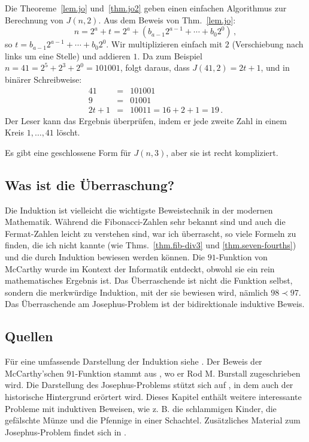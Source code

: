 Die Theoreme~\ref{lem.jo} und~\ref{thm.jo2} geben einen einfachen Algorithmus zur Berechnung von $J(n,2)$. Aus dem Beweis von Thm.~\ref{lem.jo}:
\[
n=2^a+t=2^a+(b_{a-1}2^{a-1}+\cdots+b_{0}2^{0})\,,
\]
so $t=b_{a-1}2^{a-1}+\cdots+b_{0}2^{0}$. Wir multiplizieren einfach mit $2$ (Verschiebung nach links um eine Stelle) und addieren $1$. Da zum Beispiel $n=41=2^5+2^3+2^0=101001$, folgt daraus, dass $J(41,2)=2t+1$, und in binärer Schreibweise:
\begin{eqnarray*}
41&=&101001\\
9&=&01001\\
2t+1&=&10011=16+2+1=19\,.
\end{eqnarray*}
Der Leser kann das Ergebnis überprüfen, indem er jede zweite Zahl in einem Kreis $1,\ldots,41$ löscht.

Es gibt eine geschlossene Form für $J(n,3)$, aber sie ist recht kompliziert.


\subsection*{Was ist die Überraschung?}

Die Induktion ist vielleicht die wichtigste Beweistechnik in der modernen Mathematik. Während die Fibonacci-Zahlen sehr bekannt sind und auch die Fermat-Zahlen leicht zu verstehen sind, war ich überrascht, so viele Formeln zu finden, die ich nicht kannte (wie Thms.~\ref{thm.fib-div3} und \ref{thm.seven-fourths}) und die durch Induktion bewiesen werden können. Die $91$-Funktion von McCarthy wurde im Kontext der Informatik entdeckt, obwohl sie ein rein mathematisches Ergebnis ist. Das Überraschende ist nicht die Funktion selbst, sondern die merkwürdige Induktion, mit der sie bewiesen wird, nämlich $98\prec 97$. Das Überraschende am Josephus-Problem ist der bidirektionale induktive Beweis.

\subsection*{Quellen}

Für eine umfassende Darstellung der Induktion siehe \cite{gunderson}. Der Beweis der McCarthy'schen $91$-Funktion stammt aus \cite{manna}, wo er Rod M. Burstall zugeschrieben wird. Die Darstellung des Josephus-Problems stützt sich auf \cite[Chapter~17]{gunderson}, in dem auch der historische Hintergrund erörtert wird. Dieses Kapitel enthält weitere interessante Probleme mit induktiven Beweisen, wie z. B. die schlammigen Kinder, die gefälschte Münze und die Pfennige in einer Schachtel. Zusätzliches Material zum Josephus-Problem findet sich in \cite{schumer,wiki:josephus}.
